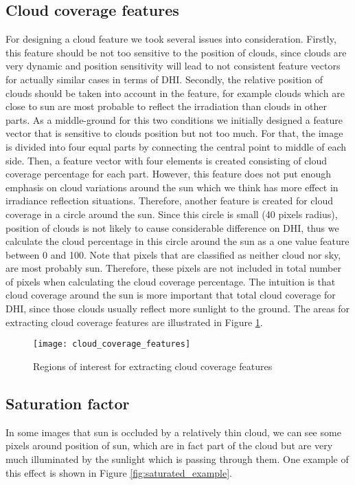 \subsection{Cloud coverage features}
\label{sec:cc_around_sun}
For designing a cloud feature we took several issues into consideration. Firstly, this feature should be not too sensitive to the position of clouds, since clouds are very dynamic and position sensitivity will lead to not consistent feature vectors for actually similar cases in terms of DHI. Secondly, the relative position of clouds should be taken into account in the feature, for example clouds which are close to sun are most probable to reflect the irradiation than clouds in other parts. As a middle-ground for this two conditions we initially designed a feature vector that is sensitive to clouds position but not too much. For that, the image is divided into four equal parts by connecting the central point to middle of each side. Then, a feature vector with four elements is created consisting of cloud coverage percentage for each part. However, this feature does not put enough emphasis on cloud variations around the sun which we think has more effect in irradiance reflection situations. Therefore, another feature is created for cloud coverage in a circle around the sun. Since this circle is small (40 pixels radius), position of clouds is not likely to cause considerable difference on DHI, thus we calculate the cloud percentage in this circle around the sun as a one value feature between 0 and 100. Note that pixels that are classified as neither cloud nor sky, are most probably sun. Therefore, these pixels are not included in total number of pixels when calculating the cloud coverage percentage. The intuition is that cloud coverage around the sun is more important that total cloud coverage for DHI, since those clouds usually reflect more sunlight to the ground. The areas for extracting cloud coverage features are illustrated in Figure \ref{fig:cloud_coverage_features}.

\begin{figure}[h]
\caption{Regions of interest for extracting cloud coverage features}
\label{fig:cloud_coverage_features}
\texttt{[image: cloud\_coverage\_features]}
\centering
\end{figure}

\subsection{Saturation factor}
\label{sec:saturation}
In some images that sun is occluded by a relatively thin cloud, we can see some pixels around position of sun, which are in fact part of the cloud but are very much illuminated by the sunlight which is passing through them. One example of this effect is shown in Figure \ref{fig:saturated_example}. 

